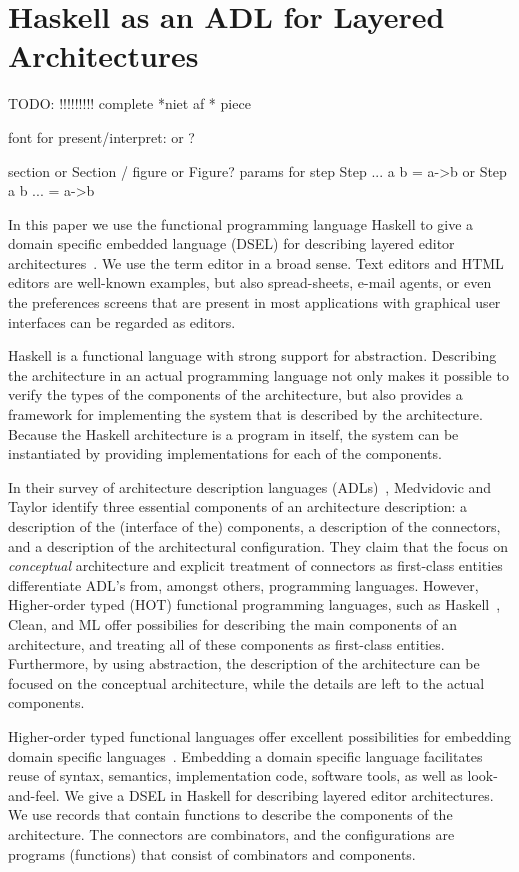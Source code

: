 \chapter{Haskell as an ADL for Layered Architectures} \label{chap:archCombs}

\bc
TODO: !!!!!!!!! complete *niet af * piece

font for present/interpret: {\tt } or $$?

section or Section / figure or Figure?
params for step Step ... a b = a->b or Step a b ... = a->b
\ec

In this paper we use the functional programming language Haskell to give a domain specific embedded language (DSEL) for describing layered editor architectures~\cite{architecture}. We use the term editor in a broad sense. Text editors and HTML editors are well-known examples, but also spread-sheets, e-mail agents, or even the preferences screens that are present in most applications with graphical user interfaces can be regarded as editors.

 Haskell is a functional language with strong support for abstraction. Describing the architecture in an actual programming language not only makes it possible to verify the types of the components of the architecture, but also provides a framework for implementing the system that is described by the architecture. Because the Haskell architecture is a program in itself, the system can be instantiated by providing implementations for each of the components.

In their survey of architecture description languages (ADLs)~\cite{medvidovicTaylor}, Medvidovic and Taylor identify three essential components of an architecture description: a description of the (interface of the) components, a description of the connectors, and a description of the architectural configuration. They claim that the focus on {\em conceptual} architecture and explicit treatment of connectors as first-class entities differentiate ADL's from, amongst others, programming languages. However, Higher-order typed (HOT) functional programming languages, such as Haskell~\cite{haskel}, Clean, and ML offer possibilies for describing the main components of an architecture, and treating all of these components as first-class entities. Furthermore, by using abstraction, the description of the architecture can be focused on the conceptual architecture, while the details are left to the actual components.

Higher-order typed functional languages offer excellent possibilities for embedding domain specific languages~\cite{hudak}. Embedding a domain specific language facilitates reuse of syntax, semantics, implementation code, software tools, as well as look-and-feel. We give a DSEL in Haskell for describing layered editor architectures. We use records that contain functions to describe the components of the architecture. The connectors are combinators, and the configurations are programs (functions) that consist of combinators and components. 

